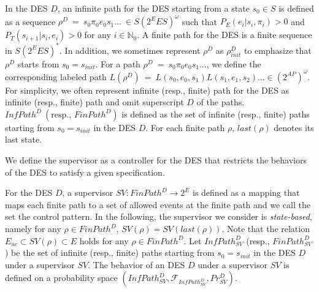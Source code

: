 \documentclass[a4j,12pt,oneside,openany,english,dvipdfmx]{jsbook}
\begin{document}
\begin{definition}
In the DES $D$, an infinite path for the DES starting from a state $s_0 \in S$ is defined as a sequence $\rho^D\ =\ s_0\pi_0e_0s_1 \ldots\ \in S (2^E E S)^{\omega}$ such that $P_E(e_i|s_i, \pi_i) > 0$ and $P_T(s_{i+1}|s_i, e_i) > 0$ for any $ i \in \mathbb{N}_0$. A finite path for the DES is a finite sequence in $S (2^E E S)^*$. In addition, we sometimes represent $\rho^D$ as $\rho^D_{init}$ to emphasize that $\rho^D$ starts from $s_0 = s_{init}$.
For a path $\rho^D\ =\ s_0\pi_0e_0s_1 \ldots$, we define the corresponding labeled path $L(\rho^D)\ =\ L(s_0,e_0,s_1)L(s_1,e_1,s_2) \ldots \in (2^{AP})^{\omega}$.
For simplicity, we often represent infinite (resp., finite) path for the DES as infinite (resp., finite) path and omit superscript $D$ of the paths.
 $InfPath^{D}\ ( \text{resp., }FinPath^{D})$ is defined as the set of infinite (resp., finite) paths starting from $s_0=s_{init}$ in the DES $D$. For each finite path $\rho$, $last(\rho)$ denotes its last state.
\end{definition}

We define the supervisor as a controller for the DES that restricts the behaviors of the DES to satisfy a given specification.

\begin{definition}[Supervisor]
For the DES $D$,  a supervisor $SV : FinPath^{D} \rightarrow 2^E$ is defined as a mapping that maps each finite path to a set of allowed events at the finite path and we call the set the control pattern. In the following, the supervisor we consider is {\it state-based}, namely for any $\rho \in FinPath^{D}$, $SV(\rho) = SV(last(\rho))$. Note that the relation $E_{uc} \subset SV(\rho) \subset E$ holds for any $\rho \in FinPath^D$.
Let $InfPath^{D}_{SV}$ (resp., $FinPath^{D}_{SV}$) be the set of infinite (resp., finite) paths starting from $s_0=s_{init}$ in the DES $D$ under a supervisor $SV$. The behavior of an DES $D$ under a supervisor $SV$ is defined on a probability space $(InfPath^{D}_{SV}, \mathcal{F}_{InfPath^{D}_{SV}}, Pr^{D}_{SV})$.
\end{definition}
\end{document}
